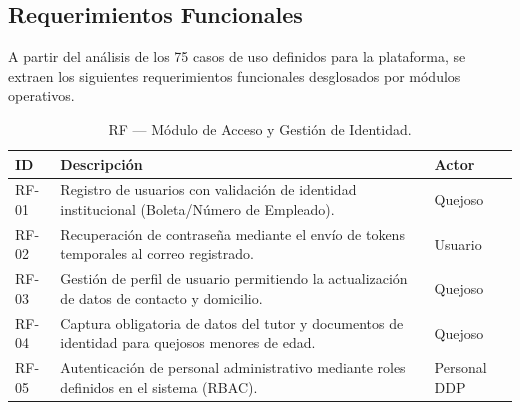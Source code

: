 \documentclass[12pt, oneside, letterpaper]{book}
\begin{document}
\subsection{Requerimientos Funcionales}

A partir del análisis de los 75 casos de uso definidos para la plataforma,
se extraen los siguientes requerimientos funcionales desglosados por módulos
operativos.

\begin{table}[H]
\centering
\caption{RF — Módulo de Acceso y Gestión de Identidad.}
\begin{tabularx}{\textwidth}{@{} l L l @{}}
\toprule
{}
\textbf{\color{white} ID} & \textbf{\color{white} Descripción} & \textbf{\color{white} Actor} \\ \midrule
{}
RF-01 & Registro de usuarios con validación de identidad institucional (Boleta/Número de Empleado). & Quejoso \\
RF-02 & Recuperación de contraseña mediante el envío de tokens temporales al correo registrado. & Usuario \\
RF-03 & Gestión de perfil de usuario permitiendo la actualización de datos de contacto y domicilio. & Quejoso \\
RF-04 & Captura obligatoria de datos del tutor y documentos de identidad para quejosos menores de edad. & Quejoso \\
RF-05 & Autenticación de personal administrativo mediante roles definidos en el sistema (RBAC). & Personal DDP \\ \bottomrule
\end{tabularx}
\end{table}
\end{document}
